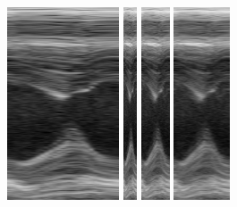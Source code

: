 \documentclass[journal]{IEEEtran}
\begin{document}
\begin{figure}[t]
\hspace{0.02cm}
\includegraphics[height=2.25in]
{figures/decoded/2015-07-27-10-36-06_2015-07-15-16-56-16_1.raw.bmode/Input_Mag_8_kernel_regression_phase_sim.png}
\hspace{1.0cm}
\includegraphics[height=2.25in]{figures/decoded/2015-07-27-10-36-06_2015-07-15-16-56-16_1.raw.bmode/Input_Mag_1_kernel_regression_phase.png}
\hspace{0.02cm}
\includegraphics[height=2.25in]{figures/decoded/2015-07-27-10-36-06_2015-07-15-16-56-16_1.raw.bmode/Input_Mag_2_kernel_regression_phase.png}
\hspace{0.02cm}
\includegraphics[height=2.25in]{figures/decoded/2015-07-27-10-36-06_2015-07-15-16-56-16_1.raw.bmode/Input_Mag_4_kernel_regression_phase.png}

\end{figure}
\end{document}
